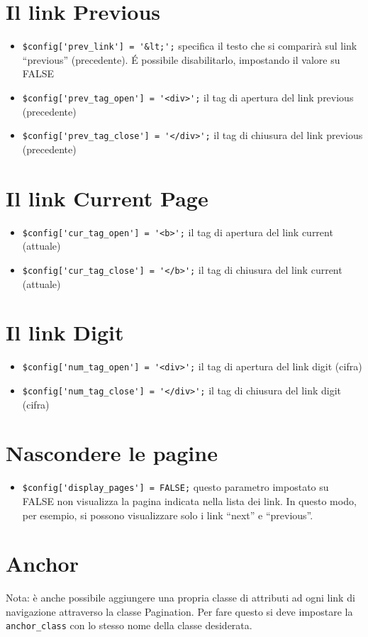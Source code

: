 \section*{Il link Previous}

\begin{itemize}
\item \verb|$config['prev_link'] = '&lt;';| specifica il testo che si comparirà  sul link ``previous'' (precedente). \'E possibile disabilitarlo, impostando il valore su FALSE
\item \verb|$config['prev_tag_open'] = '<div>';| il tag di apertura del link previous (precedente)
\item \verb|$config['prev_tag_close'] = '</div>';| il tag di chiusura del link previous (precedente)
\end{itemize}

\section*{Il link Current Page}
\begin{itemize}
\item \verb|$config['cur_tag_open'] = '<b>';| il tag di apertura del link current (attuale)
\item \verb|$config['cur_tag_close'] = '</b>';| il tag di chiusura del link current (attuale)
\end{itemize}

\section*{Il link Digit}
\begin{itemize}
\item \verb|$config['num_tag_open'] = '<div>';| il tag di apertura del link digit (cifra)
\item \verb|$config['num_tag_close'] = '</div>';| il tag di chiusura del link digit (cifra)
\end{itemize}

\section*{Nascondere le pagine}
\begin{itemize}
\item \verb|$config['display_pages'] = FALSE;| questo parametro impostato su FALSE non visualizza la pagina indicata nella lista dei link. In questo modo, per esempio, si possono visualizzare solo i link ``next'' e ``previous''.
\end{itemize}

\section*{Anchor}
Nota: è anche possibile aggiungere una propria classe di attributi ad ogni link di navigazione attraverso la classe Pagination. Per fare questo si deve impostare la \verb|anchor_class| con lo stesso nome della classe desiderata.